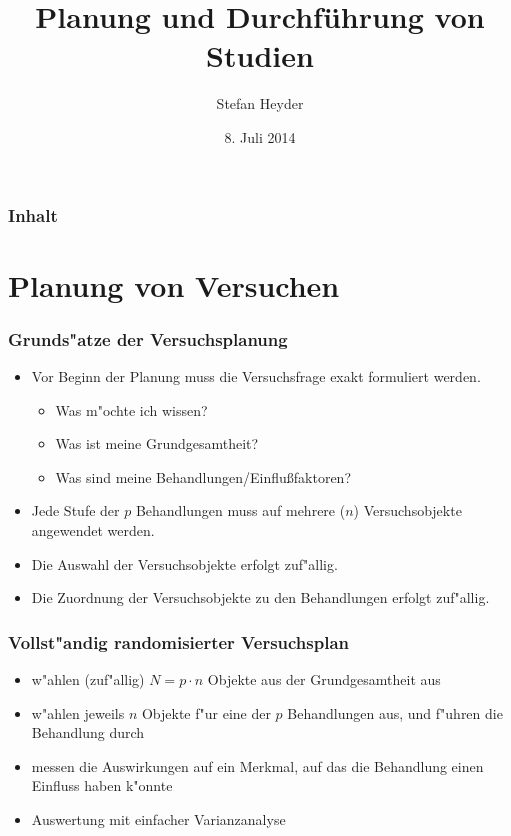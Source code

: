 \documentclass{beamer}
\title{Planung und Durchf\"uhrung von Studien}
\author{Stefan Heyder}
\institute{TU Ilmenau}
\date{8. Juli 2014}
\begin{document}
\begin{frame}
  \titlepage
\end{frame}

\begin{frame}
  \frametitle{Inhalt} 
  \tableofcontents 
\end{frame}

\section{Planung von Versuchen}

\begin{frame}
  \frametitle{Grunds"atze der Versuchsplanung}
  \begin{itemize}[<+->]
    \item Vor Beginn der Planung muss die Versuchsfrage exakt formuliert werden.
      \begin{itemize}[<+->]
        \item Was m"ochte ich wissen?
        \item Was ist meine Grundgesamtheit?
        \item Was sind meine Behandlungen/Einflu\ss faktoren?
      \end{itemize}
    \item Jede Stufe der $p$ Behandlungen muss auf mehrere ($n$) Versuchsobjekte angewendet werden.
    \item Die Auswahl der Versuchsobjekte erfolgt zuf"allig.
    \item Die Zuordnung der Versuchsobjekte zu den Behandlungen erfolgt zuf"allig.
  \end{itemize}
\end{frame}

\begin{frame}
  \frametitle{Vollst"andig  randomisierter Versuchsplan}
  \begin{itemize}[<+->]
    \item w"ahlen (zuf"allig) $N=p\cdot n$ Objekte aus der Grundgesamtheit aus
    \item w"ahlen jeweils $n$ Objekte f"ur eine der $p$ Behandlungen aus, und f"uhren die Behandlung durch
    \item messen die Auswirkungen auf ein Merkmal, auf das die Behandlung einen Einfluss haben k"onnte
    \item Auswertung mit einfacher Varianzanalyse
  \end{itemize}
\end{frame}
\end{document}
